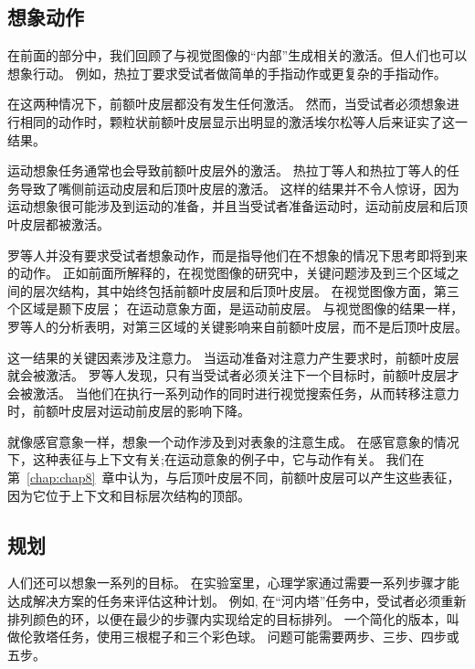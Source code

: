 \subsection{想象动作}

在前面的部分中，我们回顾了与视觉图像的“内部”生成相关的激活。但人们也可以想象行动。
例如，热拉丁\cite{gerardin2000partially}要求受试者做简单的手指动作或更复杂的手指动作。
\par


在这两种情况下，前额叶皮层都没有发生任何激活。
然而，当受试者必须想象进行相同的动作时，颗粒状前额叶皮层显示出明显的激活埃尔松等人\cite{ehrsson2003imagery}后来证实了这一结果。
\par


运动想象任务通常也会导致前额叶皮层外的激活。
热拉丁等人和热拉丁等人的任务导致了嘴侧前运动皮层和后顶叶皮层的激活。
这样的结果并不令人惊讶，因为运动想象很可能涉及到运动的准备\cite{jeannerod2006motor}，并且当受试者准备运动时，运动前皮层和后顶叶皮层都被激活\cite{toni2002multiple}。
\par


罗等人\cite{rowe2002attention}并没有要求受试者想象动作，而是指导他们在不想象的情况下思考即将到来的动作。
正如前面所解释的，在视觉图像的研究中，关键问题涉及到三个区域之间的层次结构，其中始终包括前额叶皮层和后顶叶皮层。
在视觉图像方面，第三个区域是颞下皮层；
在运动意象方面，是运动前皮层。
与视觉图像的结果一样，罗等人的分析表明，对第三区域的关键影响来自前额叶皮层，而不是后顶叶皮层。
\par


这一结果的关键因素涉及注意力。
当运动准备对注意力产生要求时，前额叶皮层就会被激活。
罗等人发现，只有当受试者必须关注下一个目标时，前额叶皮层才会被激活。
当他们在执行一系列动作的同时进行视觉搜索任务，从而转移注意力时，前额叶皮层对运动前皮层的影响下降。
\par


就像感官意象一样，想象一个动作涉及到对表象的注意生成。
在感官意象的情况下，这种表征与上下文有关;在运动意象的例子中，它与动作有关。
我们在第~\ref{chap:chap8}~章中认为，与后顶叶皮层不同，前额叶皮层可以产生这些表征，因为它位于上下文和目标层次结构的顶部。
\par



\subsection{规划}

人们还可以想象一系列的目标。
在实验室里，心理学家通过需要一系列步骤才能达成解决方案的任务来评估这种计划。
例如, 在“河内塔”任务中，受试者必须重新排列颜色的环，以便在最少的步骤内实现给定的目标排列。
一个简化的版本，叫做伦敦塔任务，使用三根棍子和三个彩色球\cite{shallice1982specific}。
问题可能需要两步、三步、四步或五步。
\par



